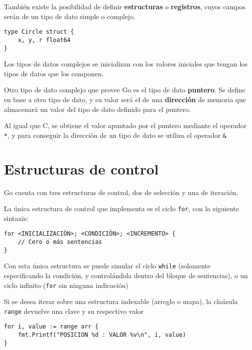 También existe la posibilidad de definir \textbf{estructuras} o \textbf{registros}, cuyos campos serán de un tipo de dato simple o complejo.

\vspace*{5mm}
\begin{lstlisting}[title=Definición de un tipo de registro \texttt{Circle} con tres campos del mismo tipo]
type Circle struct {
    x, y, r float64
}
\end{lstlisting}

Los tipos de datos complejos se inicializan con los valores iniciales que tengan los tipos de datos que los componen.

Otro tipo de dato complejo que provee Go es el tipo de dato \textbf{puntero}. Se define en base a otro tipo de dato, y su valor será el de una \textbf{dirección} de memoria que almacenará un valor del tipo de dato definido para el puntero. 

Al igual que C, se obtiene el valor apuntado por el puntero mediante el operador \texttt{*}, y para conseguir la dirección de un tipo de dato se utiliza el operador \texttt{\&} 



\section{Estructuras de control}

Go cuenta con tres estructuras de control, dos de selección y una de iteración.

La única estructura de control que implementa es el ciclo \texttt{for}, con la siguiente sintaxis:

\begin{lstlisting}[title=\centering Sintaxis del ciclo \texttt{for} (la llave debe estar en la misma línea que las sentencias de incremento)]
for <INICIALIZACIÓN>; <CONDICIÓN>; <INCREMENTO> {
    // Cero o más sentencias
} 
\end{lstlisting}

Con esta única estructura se puede simular el ciclo \texttt{while} (solamente especificando la condición, y controlándola dentro del bloque de sentencias), o un ciclo infinito (\texttt{for} sin ninguna indicación) 

Si se desea iterar sobre una estructura indexable (arreglo o mapa), la claúsula \texttt{range} devuelve una clave y su respectivo valor   

\vspace*{5mm}
\begin{lstlisting}[title=Iterando sobre un arreglo con \texttt{range}]
for i, value := range arr {
    fmt.Printf("POSICION %d : VALOR %v\n", i, value)
} 
\end{lstlisting}

